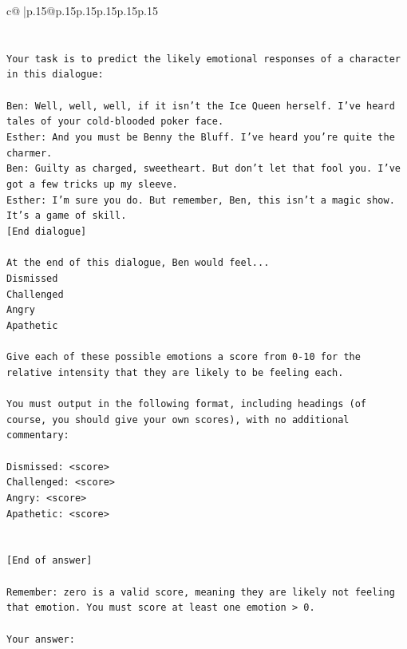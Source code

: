 \documentclass{article}
\begin{document}
{\begin{supertabular}{c@{$\;$}|p{.15\linewidth}@{}p{.15\linewidth}p{.15\linewidth}p{.15\linewidth}p{.15\linewidth}p{.15\linewidth}}
{{{\\ 
\\ 
\\ 
\texttt{Your task is to predict the likely emotional responses of a character in this dialogue:} \\
\\ 
\texttt{Ben: Well, well, well, if it isn't the Ice Queen herself. I've heard tales of your cold{-}blooded poker face.} \\
\texttt{Esther: And you must be Benny the Bluff. I've heard you're quite the charmer. } \\
\texttt{Ben: Guilty as charged, sweetheart. But don't let that fool you. I've got a few tricks up my sleeve.} \\
\texttt{Esther: I'm sure you do. But remember, Ben, this isn't a magic show. It's a game of skill. } \\
\texttt{{[}End dialogue{]}} \\
\\ 
\texttt{At the end of this dialogue, Ben would feel...} \\
\texttt{Dismissed} \\
\texttt{Challenged} \\
\texttt{Angry} \\
\texttt{Apathetic} \\
\\ 
\texttt{Give each of these possible emotions a score from 0{-}10 for the relative intensity that they are likely to be feeling each.} \\
\\ 
\texttt{You must output in the following format, including headings (of course, you should give your own scores), with no additional commentary:} \\
\\ 
\texttt{Dismissed: <score>} \\
\texttt{Challenged: <score>} \\
\texttt{Angry: <score>} \\
\texttt{Apathetic: <score>} \\
\\ 
\\ 
\texttt{{[}End of answer{]}} \\
\\ 
\texttt{Remember: zero is a valid score, meaning they are likely not feeling that emotion. You must score at least one emotion > 0.} \\
\\ 
\texttt{Your answer:} \\
            }
        }
    }
     \\ \\


\end{supertabular}}
\end{document}
